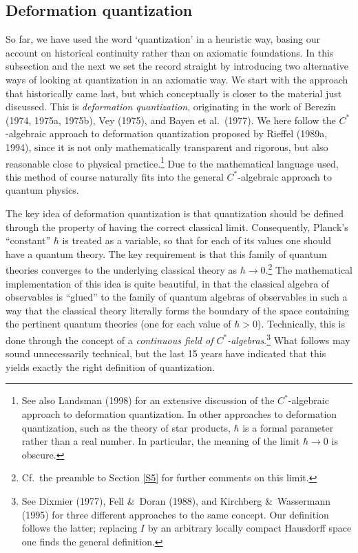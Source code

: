 \documentclass[12pt,titlepage]{article}
\newcommand{\ca}{$C^*$-algebra} \newcommand{\jba}{JB-algebra}
\newcommand{\raw}{\rightarrow} \newcommand{\rat}{\mapsto}
\begin{document}
 \subsection{Deformation quantization}\label{DQsection}
 So far, we have used the word `quantization' in a heuristic way, basing our account on historical continuity rather than on axiomatic foundations. In this subsection and the next we set the record straight by introducing two alternative ways of looking at quantization in an axiomatic way. We start with the approach that historically came last, but which conceptually is closer to the material just discussed. This is {\it deformation quantization}, originating in the work of Berezin (1974, 1975a, 1975b), Vey (1975),  and  Bayen et al.\ (1977). We here follow the \ca ic approach to deformation quantization proposed by Rieffel (1989a, 1994), since it is not only mathematically transparent and rigorous, but also reasonable close to physical practice.\footnote{See also Landsman (1998) for an extensive discussion of the  \ca ic approach to deformation quantization. In other approaches  to deformation quantization, such as the theory of star products, $\hbar$ is a formal parameter rather than a real number. In particular, the meaning of the limit $\hbar\raw 0$ is obscure.} Due to the mathematical language used, this method of course naturally fits into the general  $C^*$-algebraic approach to quantum physics.
 
The key idea of  deformation quantization is that quantization should be defined through the property of having the correct classical limit. Consequently, Planck's ``constant'' $\hbar$ is treated as a variable, so that for each of its values one should have a quantum theory. The key requirement is that this family of quantum theories converges to the underlying classical theory as $\hbar\raw 0$.\footnote{Cf.\ the preamble to Section \ref{S5} for further comments on this limit.}  The mathematical implementation of this idea is quite beautiful, in that the classical algebra of observables is ``glued'' to the family of quantum  algebras of observables in such a way that the classical theory  literally forms the boundary of the space containing the pertinent quantum theories (one for each value of $\hbar>0$). Technically, this is done through the concept of a {\it continuous field of
 \ca s}.\footnote{See Dixmier (1977), Fell \&\ Doran (1988), and Kirchberg \&\  Wassermann (1995) for three different approaches to the same concept. Our definition follows the latter;
replacing $I$ by an arbitrary locally compact Hausdorff space one finds the general definition.}  What follows may sound unnecessarily technical, but the last 15 years have indicated that this yields exactly the right definition of quantization.
\end{document}
